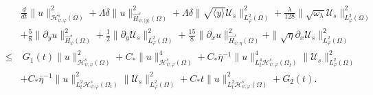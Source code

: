 \documentclass{amsart}
\numberwithin{equation}{section}
\newcommand\y{{{\langle y \rangle}}}
\begin{document}
\begin{align}\label{upe-3}
& \frac{d}{dt}\|u\|_{\mathcal{H}_{\psi,\varphi}^{s}(\Omega)}^{2}
 +\Lambda\delta\|u\|_{\hat{H}_{\psi,\y}^{s}(\Omega)}^{2}
 +\Lambda\delta\|\sqrt{\y}\mathcal{U}_{s}\|_{L_{\varphi}^{2}(\Omega)}^{2}
 +\frac{\lambda}{128}\|\sqrt{\omega_{\lambda}}\mathcal{U}_{s}\|_{L_{\varphi}^{2}(\Omega)}^{2}\\
&+\frac{5}{8}\|\partial_{y}u\|_{\hat{H}_{\psi}^{s}(\Omega)}^{2}
 +\frac{1}{2}\|\partial_{y}\mathcal{U}_{s}\|_{L_{\varphi}^{2}(\Omega)}^{2}
 +\frac{15}{8}\|\partial_{x}u\|_{\hat{H}_{\psi,\eta}^{s}(\Omega)}^{2}
 +\|\sqrt{\eta}\partial_{x}\mathcal{U}_{s}\|_{L_{\varphi}^{2}(\Omega)}^{2}\nonumber\\
\leq&~G_{1}(t)\|u\|_{\mathcal{H}_{\psi,\varphi}^{s}(\Omega)}^{2}
     +C_{*}\|u\|_{\mathcal{H}_{\psi,\varphi}^{s}(\Omega)}^{4}
     +C_{*}\bar{\eta}^{-1}\|u\|_{L_{t}^{4}\mathcal{H}_{\psi,\varphi}^{s}(\Omega_{t})}^{4}\|\mathcal{U}_{s}\|_{L_{\varphi}^{2}(\Omega)}^{2}\nonumber\\
    &+C_{*}\bar{\eta}^{-1}\|u\|_{L_{t}^{2}\mathcal{H}_{\psi,\varphi}^{s}(\Omega_{t})}^{2}\|\mathcal{U}_{s}\|_{L_{\varphi}^{2}(\Omega)}^{2}
     +C_{*}t\|u\|_{L_{t}^{2}\mathcal{H}_{\psi,\varphi}^{s}(\Omega)}^{2}
     +G_{2}(t)\nonumber.
\end{align}
\end{document}
